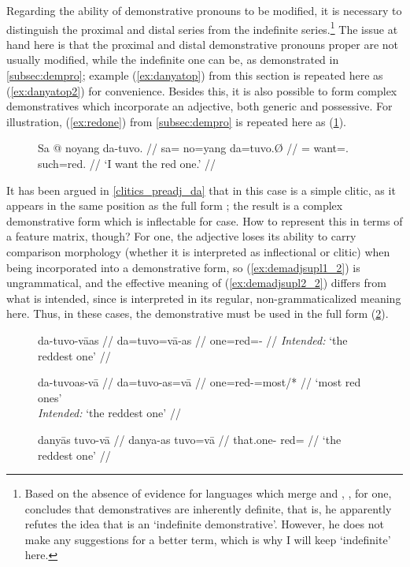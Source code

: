 Regarding the ability of demonstrative pronouns to be modified, it is
necessary to distinguish the proximal  and distal
series from the indefinite series.\footnote{Based
on the absence of evidence for languages which merge  and ,
\citet[152]{lyons1999}, for one, concludes that demonstratives are inherently
definite, that is, he apparently refutes the idea that  is an
`indefinite demonstrative'. However, he does not make any suggestions for a
better term, which is why I will keep `indefinite' here.} The issue at hand
here is that the proximal and distal demonstrative pronouns proper are not
usually modified, while the indefinite one can be, as demonstrated in
\autoref{subsec:dempro}; example (\ref{ex:danyatop}) from this section is
repeated here as (\ref{ex:danyatop2}) for convenience. Besides this, it is also
possible to form complex demonstratives which incorporate an adjective, both
generic and possessive. For illustration, (\ref{ex:redone}) from
\autoref{subsec:dempro} is repeated here as (\ref{ex:redone2}).

\begin{figure}[h]
\ex\label{ex:redone2}\begingl
	\gla Sa @ noyang da-tuvo. //
	\glb sa= no=yang da=tuvo.Ø //
	\glc \PatT{}= want=\Fsg{}.\Aarg{} such=red.\Top{} //
	\glft `I want the red one.' //
\endgl\xe
\end{figure}

It has been argued in \autoref{clitics_preadj_da} that  in this
case is a simple clitic, as it appears in the same position as the full form
; the result is a complex demonstrative form which is
inflectable for case. How to represent this in terms of a feature matrix,
though? For one, the adjective loses its ability to carry comparison morphology
(whether it is interpreted as inflectional or clitic) when being incorporated
into a demonstrative form, so (\ref{ex:demadjsupl1_2}) is ungrammatical, and
the effective meaning of (\ref{ex:demadjsupl2_2}) differs from what is
intended, since  is interpreted in its regular,
non-grammaticalized meaning here. Thus, in these cases, the demonstrative must
be used in the full form (\ref{ex:demfreeadjsupl}).

\begin{figure}
\pex
\a\label{ex:demadjsupl1_2}\ljudge*\begingl
	\gla da-tuvo-vāas //
	\glb da=tuvo=vā-as //
	\glc one=red=\Supl{}-\Parg{} //
	\glft \textit{Intended:} `the reddest one' //
\endgl

\a\label{ex:demadjsupl2_2}\ljudge\excl\begingl
	\gla da-tuvoas-vā //
	\glb da=tuvo-as=vā //
	\glc one=red-\Parg{}=most/*\Supl{} //
	\glft `most red ones' \\
		\textit{Intended:} `the reddest one' //
\endgl

\a\label{ex:demfreeadjsupl}\begingl
	\gla danyās tuvo-vā //
	\glb danya-as tuvo=vā //
	\glc that.one-\Parg{} red=\Supl{} //
	\glft `the reddest one' //
\endgl
\xe
\end{figure}

